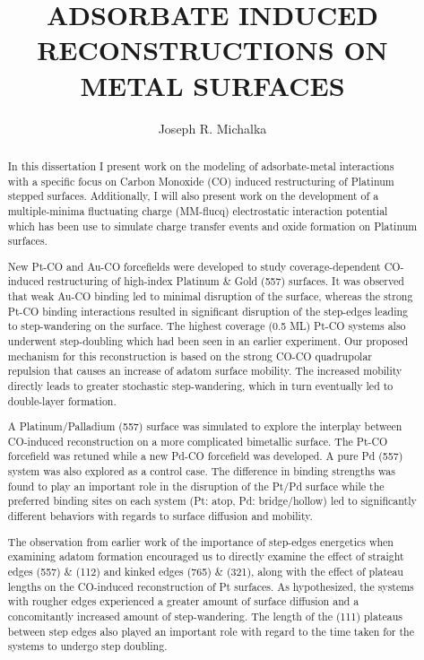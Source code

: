 \begin{abstract}
\title{ADSORBATE INDUCED RECONSTRUCTIONS ON METAL SURFACES}
\author{Joseph R. Michalka}
In this dissertation I present work on the modeling of adsorbate-metal
interactions with a specific focus on Carbon Monoxide (CO) induced
restructuring of Platinum stepped surfaces. Additionally, I will also present
work on the development of a multiple-minima fluctuating charge (MM-flucq)
electrostatic interaction potential which has been use to simulate charge
transfer events and oxide formation on Platinum surfaces.

New Pt-CO and Au-CO forcefields were developed to study coverage-dependent
CO-induced restructuring of high-index Platinum \& Gold (557) surfaces. It was observed
that weak Au-CO binding led to minimal disruption of the surface, whereas the
strong Pt-CO binding interactions resulted in significant disruption of the
step-edges leading to step-wandering on the surface. The highest coverage (0.5
ML) Pt-CO systems also underwent step-doubling which had been seen in an
earlier experiment. Our proposed mechanism for this reconstruction is based on
the strong CO-CO quadrupolar repulsion that causes an increase of adatom surface
mobility. The increased mobility directly leads to greater stochastic
step-wandering, which in turn eventually led to double-layer formation.

A Platinum/Palladium (557) surface was simulated to explore the interplay between
CO-induced reconstruction on a more complicated bimetallic surface. The Pt-CO
forcefield was retuned while a new Pd-CO forcefield was developed. A pure Pd
(557) system was also explored as a control case. The difference in binding
strengths was found to play an important role in the disruption of the Pt/Pd
surface while the preferred binding sites on each system (Pt: atop, Pd: bridge/hollow)
led to significantly different behaviors with regards to surface diffusion and
mobility.

The observation from earlier work of the importance of step-edges energetics
when examining adatom formation encouraged us to directly examine the effect of
straight edges (557) \& (112) and kinked edges (765) \& (321), along with the effect of
plateau lengths on the CO-induced reconstruction of Pt surfaces. As
hypothesized, the systems with rougher edges experienced a greater amount of
surface diffusion and a concomitantly increased amount of step-wandering. The
length of the (111) plateaus between step edges also played an important role
with regard to the time taken for the systems to undergo step doubling.


\end{abstract}
